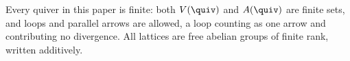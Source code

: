 \begin{convention}\label{sh-0001}
Every quiver in this paper is finite: both $V(\quiv)$ and $A(\quiv)$ are finite sets, and loops and parallel arrows are allowed, a loop counting as one arrow and contributing no divergence. All lattices are free abelian groups of finite rank, written additively.
\end{convention}